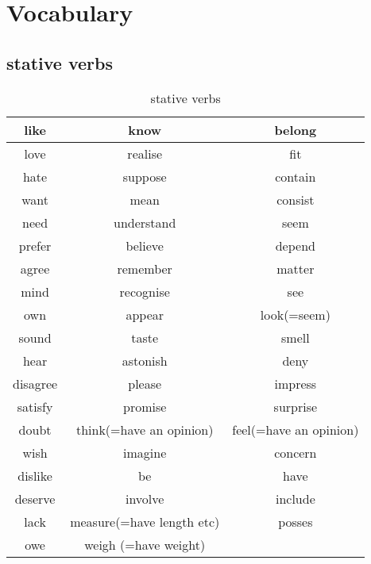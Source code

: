 \chapter{Vocabulary}

\section{stative verbs}
\label{sec:stateverbs}

\begin{table}[!h]
    \label{tab:stateverbs}
    \caption{stative verbs}
\begin{tabular}{|c|c|c|}
\hline
like&	know&	belong\\
\hline
love&	realise&	fit\\
\hline
hate&	suppose&	contain\\
\hline
want&	mean&	consist\\
\hline
need&	understand&	seem\\
\hline
prefer&	believe&	depend\\
\hline
agree&	remember&	matter\\
\hline
mind&	recognise&	see\\
\hline
own&	appear&	look(=seem)\\
\hline
sound&	taste&	smell\\
\hline
hear&	astonish&	deny\\
\hline
disagree&	please&	impress\\
\hline
satisfy&	promise&	surprise\\
\hline
doubt&	think(=have an opinion)&	feel(=have an opinion)\\
\hline
wish&	imagine&	concern\\
\hline
dislike&	be&	have\\
\hline
deserve&	involve&	include\\
\hline
lack&	measure(=have length etc)&	posses\\
\hline
owe&	weigh (=have weight)&\\
\hline
\end{tabular}
\end{table}
